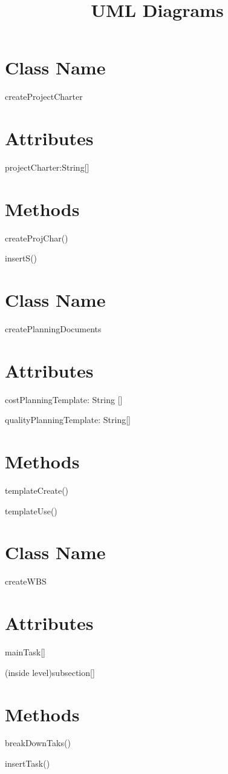 \documentclass[10pt]{article}
\begin{document}
\newpage
\title{UML Diagrams}
\hline
\section{Class Name}
    \item createProjectCharter
\section{Attributes}
    \item projectCharter:String[]
\section{Methods}
    \item createProjChar()
        \item insertS()

\section{Class Name}
    \item createPlanningDocuments
\section{ Attributes}
    \item costPlanningTemplate: String []
    \item qualityPlanningTemplate: String[]
\section{Methods}
    \item templateCreate()
    \item templateUse()

\section{Class Name}
    \item createWBS
\section{Attributes}
    \item mainTask[]
    \item (inside level)subsection[]
\section{Methods}
    \item breakDownTaks()
    \item insertTask()
\end{document}

